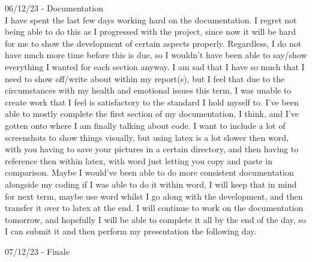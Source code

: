 \documentclass{article}
\begin{document}
06/12/23 - Documentation\\
I have spent the last few days working hard on the documentation. I regret not being able to do this as I progressed with the project, since now it will be hard for me to show the development of certain aspects properly. Regardless, I do not have much more time before this is due, so I wouldn't have been able to say/show everything I wanted for each section anyway. I am sad that I have so much that I need to show off/write about within my report(s), but I feel that due to the circumstances with my health and emotional issues this term, I was unable to create work that I feel is satisfactory to the standard I hold myself to. I've been able to mostly complete the first section of my documentation, I think, and I've gotten onto where I am finally talking about code. I want to include a lot of screenshots to show things visually, but using latex is a lot slower then word, with you having to save your pictures in a certain directory, and then having to reference then within latex, with word just letting you copy and paste in comparison. Maybe I would've been able to do more consistent documentation alongside my coding if I was able to do it within word, I will keep that in mind for next term, maybe use word whilst I go along with the development, and then transfer it over to latex at the end. I will continue to work on the documentation tomorrow, and hopefully I will be able to complete it all by the end of the day, so I can submit it and then perform my presentation the following day.\\\vspace{0.3cm}

07/12/23 - Finale
\end{document}
